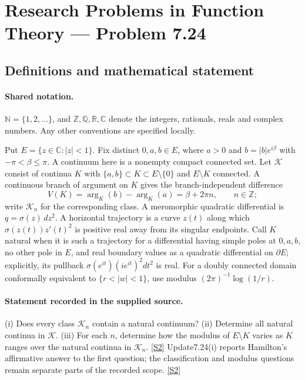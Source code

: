 \documentclass[11pt]{article}
\newcommand{\sref}[2]{\hyperlink{source:#1:#2}{[S#2]}}
\begin{document}
\section{Research Problems in Function Theory — Problem 7.24}\label{statement}

\subsection{Definitions and mathematical statement}

\paragraph{Shared notation.}$\mathbb N=\{1,2,\ldots\}$, and $\mathbb Z,\mathbb Q,\mathbb R,\mathbb C$ denote the integers, rationals, reals and complex numbers. Any other conventions are specified locally.


Put $E=\{z\in\mathbb C:|z|<1\}$. Fix distinct $0,a,b\in E$, where $a>0$ and $b=|b|e^{i\beta}$ with $-\pi<\beta\le\pi$. A continuum here is a nonempty compact connected set. Let $\mathcal K$ consist of continua $K$ with $\{a,b\}\subset K\subset E\setminus\{0\}$ and $E\setminus K$ connected. A continuous branch of argument on $K$ gives the branch-independent difference
\[V(K)=\arg_K(b)-\arg_K(a)=\beta+2\pi n,\qquad n\in\mathbb Z;\]
write $\mathcal K_n$ for the corresponding class. A meromorphic quadratic differential is $q=\sigma(z)\,dz^2$. A horizontal trajectory is a curve $z(t)$ along which $\sigma(z(t))z'(t)^2$ is positive real away from its singular endpoints. Call $K$ natural when it is such a trajectory for a differential having simple poles at $0,a,b$, no other pole in $E$, and real boundary values as a quadratic differential on $\partial E$; explicitly, its pullback $\sigma(e^{it})(ie^{it})^2dt^2$ is real. For a doubly connected domain conformally equivalent to $\{r<|w|<1\}$, use modulus $(2\pi)^{-1}\log(1/r)$.

\paragraph{Statement recorded in the supplied source.}
(i) Does every class $\mathcal K_n$ contain a natural continuum?
(ii) Determine all natural continua in $\mathcal K$.
(iii) For each $n$, determine how the modulus of $E\setminus K$ varies as $K$ ranges over the natural continua in $\mathcal K_n$. \sref{statement}{2}
Update7.24(i) reports Hamilton's affirmative answer to the first question; the classification and modulus questions remain separate parts of the recorded scope. \sref{statement}{2}
\end{document}
